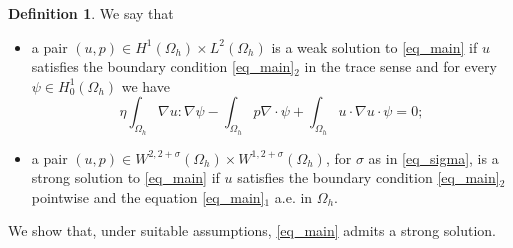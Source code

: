 \documentclass[11pt,a4paper]{amsart}
\theoremstyle{remark}
\theoremstyle{definition}
\newtheorem{definition}[proposition]{Definition}
\numberwithin{equation}{section}
\numberwithin{proposition}{section}
\begin{document}
	\begin{definition}\label{def_1}
		We say that
		\begin{itemize}
			\item a pair $(u,p)\in H^1(\Omega_h)\times L^2(\Omega_h)$ is a weak solution to \eqref{eq_main} if $u$ satisfies the boundary condition \eqref{eq_main}$_2$ in the trace sense and for every $\psi\in H_0^1(\Omega_h)$ we have
			\begin{equation}
				\eta\int_{\Omega_h}\nabla u:\nabla\psi-\int_{\Omega_h}p\nabla\cdot\psi+\int_{\Omega_h}u\cdot\nabla u\cdot\psi=0;
			\end{equation}
			\item a pair $(u,p)\in W^{2,2+\sigma}(\Omega_h)\times W^{1,2+\sigma}(\Omega_h)$, for $\sigma$ as in \eqref{eq_sigma}, is a strong solution to \eqref{eq_main} if $u$ satisfies the boundary condition \eqref{eq_main}$_2$ pointwise and the equation \eqref{eq_main}$_1$ a.e. in $\Omega_h$.
		\end{itemize}
	\end{definition}
We show that, under suitable assumptions, \eqref{eq_main} admits a strong solution.
	
\end{document}
